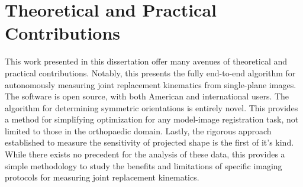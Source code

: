 \section{Theoretical and Practical Contributions}
This work presented in this dissertation offer many avenues of theoretical and practical contributions.
Notably, this presents the fully end-to-end algorithm for autonomously measuring joint replacement kinematics from single-plane images.
The software is open source, with both American and international users.
The algorithm for determining symmetric orientations is entirely novel.
This provides a method for simplifying optimization for any model-image registration task, not limited to those in the orthopaedic domain.
Lastly, the rigorous approach established to measure the sensitivity of projected shape is the first of it's kind.
While there exists no precedent for the analysis of these data, this provides a simple methodology to study the benefits and limitations of specific imaging protocols for measuring joint replacement kinematics.

